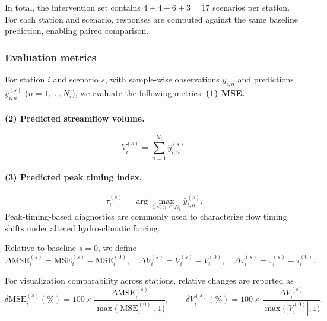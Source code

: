 \documentclass[11pt]{article}
\begin{document}
In total, the intervention set contains $4+4+6+3=17$ scenarios per station. For each station and scenario, responses are computed against the same baseline prediction, enabling paired comparison\cite{LouiseSlater2024_XAI_Hydrology}.

\subsubsection*{Evaluation metrics}

For station $i$ and scenario $s$, with sample-wise observations $y_{i,n}$ and predictions $\hat y_{i,n}^{(s)}$ ($n=1,\dots,N_i$), we evaluate the following metrics\cite{WRR_RMSE,Nse}: \textbf{(1) MSE.}

\paragraph{(2) Predicted streamflow volume.}
\begin{equation}
    V_{i}^{(s)} = \sum_{n=1}^{N_i}\hat y_{i,n}^{(s)}.
\end{equation}

\paragraph{(3) Predicted peak timing index.}
\begin{equation}
    \tau_{i}^{(s)} = \arg\max_{1\le n\le N_i}\hat y_{i,n}^{(s)}.
\end{equation}
Peak-timing-based diagnostics are commonly used to characterize flow timing shifts under altered hydro-climatic forcing\cite{bloschl2017changing}.

Relative to baseline $s=0$, we define
\begin{equation}
    \Delta\mathrm{MSE}_{i}^{(s)} = \mathrm{MSE}_{i}^{(s)}-\mathrm{MSE}_{i}^{(0)},
    \quad
    \Delta V_{i}^{(s)} = V_{i}^{(s)}-V_{i}^{(0)},
    \quad
    \Delta\tau_{i}^{(s)} = \tau_{i}^{(s)}-\tau_{i}^{(0)}.
\end{equation}

For visualization comparability across stations, relative changes are reported as
\begin{equation}
    \delta\mathrm{MSE}_{i}^{(s)}(\%) = 100\times\frac{\Delta\mathrm{MSE}_{i}^{(s)}}{\max\big(|\mathrm{MSE}_{i}^{(0)}|,1\big)},
    \qquad
    \delta V_{i}^{(s)}(\%) = 100\times\frac{\Delta V_{i}^{(s)}}{\max\big(|V_{i}^{(0)}|,1\big)}.
\end{equation}
\end{document}
